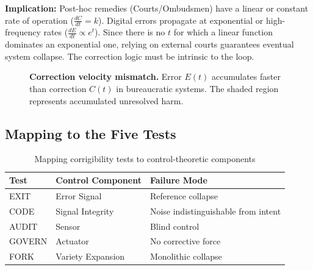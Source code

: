 \documentclass{article}
\begin{document}
\textbf{Implication:} Post-hoc remedies (Courts/Ombudsmen) have a linear or constant rate of operation ($\frac{dC}{dt} = k$). Digital errors propagate at exponential or high-frequency rates ($\frac{dE}{dt} \propto e^{t}$). Since there is no $t$ for which a linear function dominates an exponential one, relying on external courts guarantees eventual system collapse. The correction logic must be intrinsic to the loop.

\begin{figure}[htbp]
\centering
{}
\caption{\textbf{Correction velocity mismatch.} Error $E(t)$ accumulates faster than correction $C(t)$ in bureaucratic systems. The shaded region represents accumulated unresolved harm.}
\label{fig:velocity-mismatch}
\end{figure}

\subsection{Mapping to the Five Tests}

\begin{table}[htbp]
\centering
\caption{Mapping corrigibility tests to control-theoretic components}
\label{tab:control-mapping}
\begin{tabular}{lll}
\hline
\textbf{Test} & \textbf{Control Component} & \textbf{Failure Mode} \\
\hline
EXIT & Error Signal & Reference collapse \\
CODE & Signal Integrity & Noise indistinguishable from intent \\
AUDIT & Sensor & Blind control \\
GOVERN & Actuator & No corrective force \\
FORK & Variety Expansion & Monolithic collapse \\
\hline
\end{tabular}
\end{table}
\end{document}
